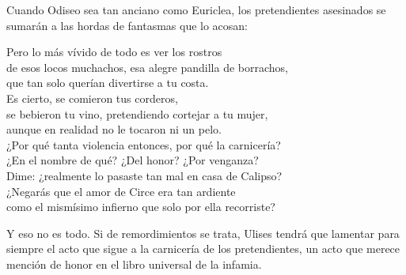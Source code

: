 Cuando Odiseo sea tan anciano como Euriclea, los pretendientes asesinados se sumarán a las hordas de fantasmas que lo acosan:

\begin{versopropio}
Pero lo más vívido de todo es ver los rostros\\
de esos locos muchachos, esa alegre pandilla de borrachos,\\
que tan solo querían divertirse a tu costa.\\
Es cierto, se comieron tus corderos,\\
se bebieron tu vino, pretendiendo cortejar a tu mujer,\\
aunque en realidad no le tocaron ni un pelo.\\
¿Por qué tanta violencia entonces, por qué la carnicería?\\
¿En el nombre de qué? ¿Del honor? ¿Por venganza?\\
Dime: ¿realmente lo pasaste tan mal en casa de Calipso?\\
¿Negarás que el amor de Circe era tan ardiente\\
como el mismísimo infierno que solo por ella recorriste?
\end{versopropio}

Y eso no es todo. Si de remordimientos se trata, Ulises tendrá que lamentar para siempre el acto que sigue a la carnicería de los pretendientes, un acto que merece mención de honor en el libro universal de la infamia.
